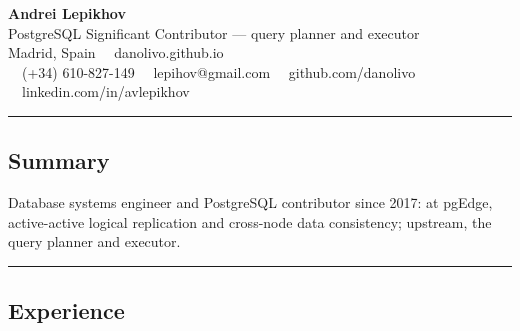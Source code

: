 \documentclass[11pt,letterpaper]{article}
\newenvironment{indentsection}[1]%
{\begin{list}{}%
{\setlength{\leftmargin}{#1}}%
     \item[]
}
{\end{list}}
\begin{document}
\begin{center}
	{\LARGE \textbf{Andrei Lepikhov}}\\
	PostgreSQL Significant Contributor --- query planner and executor\\
	Madrid, Spain \ \textperiodcentered \ danolivo.github.io
	\vspace{0.05cm}
	\\
	\raisebox{-0.2\height} {\Large \faPhoneSquare} \ \  (+34) 610-827-149 \hfill\raisebox{-0.2\height}{\Large \faEnvelopeSquare} \ \ lepihov@gmail.com \hfill \raisebox{-0.2\height}{\Large \faGithubSquare} \ \ github.com/danolivo \hfill \raisebox{-0.2\height}{\Large \faLinkedinSquare} \ \ linkedin.com/in/avlepikhov
\end{center}

\hrule
\vspace{-1em}
\subsection*{\Large Summary}

\begin{indentsection}{\parindent}
Database systems engineer and PostgreSQL contributor since 2017: at pgEdge, active-active logical replication and cross-node data consistency; upstream, the query planner and executor.
\end{indentsection}

\hrule
\vspace{-1em}
\subsection*{\Large Experience}
\end{document}
